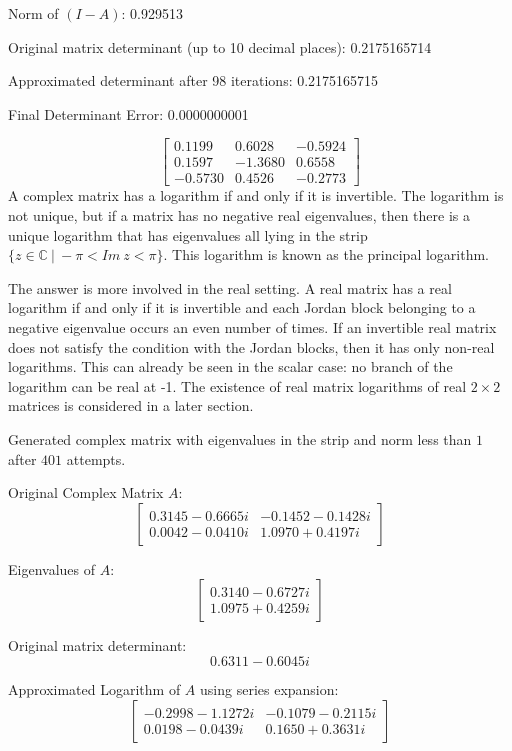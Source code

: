 Norm of $(I-A)$: 0.929513

Original matrix determinant (up to 10 decimal places): 0.2175165714

Approximated determinant after 98 iterations: 0.2175165715

Final Determinant Error: 0.0000000001

\[
    \begin{bmatrix}
        0.1199 & 0.6028 & -0.5924 \\
        0.1597 & -1.3680 & 0.6558 \\
        -0.5730 & 0.4526 & -0.2773
    \end{bmatrix}
\]\newline
 A complex matrix has a logarithm if and only if it is invertible. The logarithm is not unique, but if a matrix has no negative real eigenvalues, then there is a unique logarithm that has eigenvalues all lying in the strip $\{z \in \mathbb{C} \ \vert \ -\pi < \textit{Im} \ z < \pi\}$. This logarithm is known as the principal logarithm.

The answer is more involved in the real setting. A real matrix has a real logarithm if and only if it is invertible and each Jordan block belonging to a negative eigenvalue occurs an even number of times. If an invertible real matrix does not satisfy the condition with the Jordan blocks, then it has only non-real logarithms. This can already be seen in the scalar case: no branch of the logarithm can be real at -1. The existence of real matrix logarithms of real $2 \times 2$ matrices is considered in a later section.




Generated complex matrix with eigenvalues in the strip and norm less than $1$ after $401$ attempts.

Original Complex Matrix $A$:
\[
\begin{bmatrix}
   0.3145 - 0.6665i & -0.1452 - 0.1428i \\
   0.0042 - 0.0410i & 1.0970 + 0.4197i
\end{bmatrix}
\]

Eigenvalues of $A$:
\[
\begin{bmatrix}
   0.3140 - 0.6727i \\
   1.0975 + 0.4259i
\end{bmatrix}
\]

Original matrix determinant:
\[
0.6311 - 0.6045i
\]

Approximated Logarithm of $A$ using series expansion:
\[
\begin{bmatrix}
  -0.2998 - 1.1272i & -0.1079 - 0.2115i \\
   0.0198 - 0.0439i & 0.1650 + 0.3631i
\end{bmatrix}
\]

